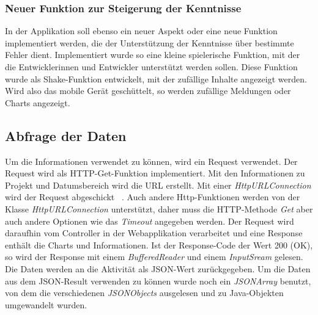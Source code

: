 \subsubsection{Neuer Funktion zur Steigerung der Kenntnisse}
In der Applikation soll ebenso ein neuer Aspekt oder eine neue Funktion implementiert werden, die der Unterstützung der Kenntnisse über bestimmte Fehler dient. Implementiert wurde so eine kleine spielerische Funktion, mit der die Entwicklerinnen und Entwickler unterstützt werden sollen. Diese Funktion wurde als Shake-Funktion entwickelt, mit der zufällige Inhalte angezeigt werden. Wird also das mobile Gerät geschüttelt, so werden zufällige Meldungen oder Charts angezeigt.
\subsection{Abfrage der Daten}
Um die Informationen verwendet zu können, wird ein Request verwendet. Der Request wird als HTTP-Get-Funktion implementiert. Mit den Informationen zu Projekt und Datumsbereich wird die URL erstellt. Mit einer \textit{HttpURLConnection} wird der Request abgeschickt ~\parencite{liu2017web}. Auch andere Http-Funktionen werden von der Klasse \textit{HttpURLConnection} unterstützt, daher muss die HTTP-Methode \textit{Get} aber auch andere Optionen wie das \textit{Timeout} angegeben werden. Der Request wird daraufhin vom Controller in der Webapplikation verarbeitet und eine Response enthält die Charts und Informationen. Ist der Response-Code der Wert 200 (OK), so wird der Response mit einem \textit{BufferedReader} und einem \textit{InputSream} gelesen. Die Daten werden an die Aktivität als JSON-Wert zurückgegeben. Um die Daten aus dem JSON-Result verwenden zu können wurde noch ein \textit{JSONArray} benutzt, von dem die verschiedenen \textit{JSONObjects} ausgelesen und zu Java-Objekten umgewandelt wurden. 
